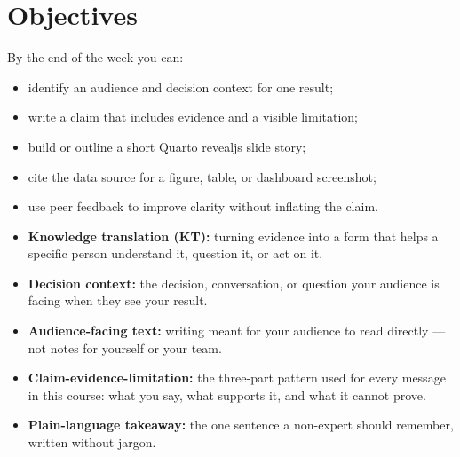 \documentclass[
  letterpaper,
  DIV=11,
  numbers=noendperiod,
  oneside]{scrreprt}
\providecommand{\tightlist}{%
  \setlength{\itemsep}{0pt}\setlength{\parskip}{0pt}}
\begin{document}
\section*{Objectives}\label{objectives-3}


By the end of the week you can:

\begin{itemize}
\tightlist
\item
  identify an audience and decision context for one result;
\item
  write a claim that includes evidence and a visible limitation;
\item
  build or outline a short Quarto revealjs slide story;
\item
  cite the data source for a figure, table, or dashboard screenshot;
\item
  use peer feedback to improve clarity without inflating the claim.
\end{itemize}

\begin{tcolorbox}[enhanced jigsaw, title=\textcolor{quarto-callout-note-color}{\faInfo}\hspace{0.5em}{Key Terms This Week}, arc=.35mm, toptitle=1mm, colframe=quarto-callout-note-color-frame, toprule=.15mm, leftrule=.75mm, bottomtitle=1mm, opacityback=0, bottomrule=.15mm, coltitle=black, breakable, opacitybacktitle=0.6, titlerule=0mm, colback=white, left=2mm, colbacktitle=quarto-callout-note-color!10!white, rightrule=.15mm]

\begin{itemize}
\tightlist
\item
  \textbf{Knowledge translation (KT):} turning evidence into a form that
  helps a specific person understand it, question it, or act on it.
\item
  \textbf{Decision context:} the decision, conversation, or question
  your audience is facing when they see your result.
\item
  \textbf{Audience-facing text:} writing meant for your audience to read
  directly --- not notes for yourself or your team.
\item
  \textbf{Claim-evidence-limitation:} the three-part pattern used for
  every message in this course: what you say, what supports it, and what
  it cannot prove.
\item
  \textbf{Plain-language takeaway:} the one sentence a non-expert should
  remember, written without jargon.
\end{itemize}

\end{tcolorbox}
\end{document}
